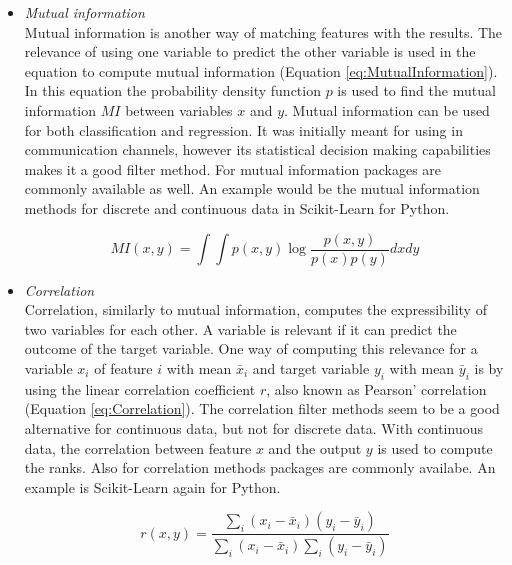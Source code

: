 \documentclass[10pt,a4paper]{article}
\begin{document}
\begin{itemize}
	\item \textit{Mutual information} \\
	Mutual information is another way of matching features with the results. The relevance of using one variable to predict the other variable is used in the equation to compute mutual information (Equation \ref{eq:MutualInformation}). In this equation the probability density function $p$ is used to find the mutual information $MI$ between variables $x$ and $y$\cite{peng2005feature}. Mutual information can be used for both classification and regression. It was initially meant for using in communication channels, however its statistical decision making capabilities makes it a good filter method\cite{battiti1994using}.
	For mutual information packages are commonly available as well. An example would be the mutual information methods for discrete and continuous data in Scikit-Learn\cite{pedregosa2011scikit} for Python.
	

	\begin{equation}\label{eq:MutualInformation}
	MI(x, y) = \int \int p(x, y) \log{\frac{p(x, y)}{p(x)p(y)}} dxdy
	\end{equation}
	
	\item \textit{Correlation} \\
	Correlation, similarly to mutual information, computes the expressibility of two variables for each other. A variable is relevant if it can predict the outcome of the target variable. One way of computing this relevance for a variable $x_i$ of feature $i$ with mean $\bar{x }_i$ and target variable $y_i$ with mean $\bar{y}_i$ is by using the linear correlation coefficient $r$, also known as Pearson' correlation\cite{yu2003feature} (Equation \ref{eq:Correlation}). The correlation filter methods seem to be a good alternative for continuous data, but not for discrete data. With continuous data, the correlation between feature $x$ and the output $y$ is used to compute the ranks\cite{hall2000correlation}.
	Also for correlation methods packages are commonly availabe. An example is Scikit-Learn\cite{pedregosa2011scikit} again for Python.
		
	\begin{equation}\label{eq:Correlation}
	r(x,y) = \frac{\sum_{i}(x_i - \bar{x}_i)(y_i -\bar{y}_i)}{\sum_{i}(x_i - \bar{x}_i)\sum_{i}(y_i -\bar{y}_i)}
	\end{equation}
	
	\end{itemize}
	
\end{document}
